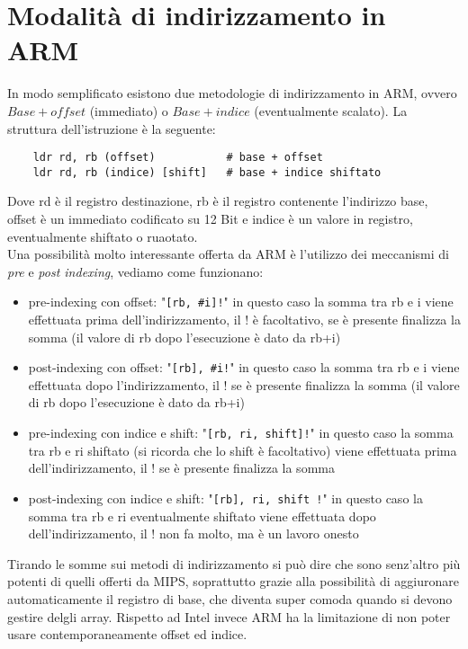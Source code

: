 \documentclass[class=book, crop=false]{standalone}
\begin{document}
\section{Modalità di indirizzamento in ARM}
In modo semplificato esistono due metodologie di indirizzamento in ARM, ovvero $Base + offset$ (immediato) o $Base + indice$ (eventualmente scalato). La struttura dell'istruzione è la seguente:

\begin{verbatim}
	ldr rd, rb (offset)           # base + offset
	ldr rd, rb (indice) [shift]   # base + indice shiftato
\end{verbatim}

Dove rd è il registro destinazione, rb è il registro contenente l'indirizzo base, offset è un immediato codificato su 12 Bit e indice è un valore in registro, eventualmente shiftato o ruaotato.\\
Una possibilità molto interessante offerta da ARM è l'utilizzo dei meccanismi di \emph{pre} e \emph{post indexing}, vediamo come funzionano:

\begin{itemize}
	\item pre-indexing con offset: "\texttt{[rb, \#i]!}" in questo caso la somma tra rb e i viene  effettuata prima dell'indirizzamento, il ! è facoltativo, se è presente finalizza la somma (il valore di rb dopo l'esecuzione è dato da rb+i)
	\item post-indexing con offset: "\texttt{[rb], \#i!}" in questo caso la somma tra rb e i viene  effettuata dopo l'indirizzamento, il ! se è presente finalizza la somma (il valore di rb dopo l'esecuzione è dato da rb+i)
	\item pre-indexing con indice e shift: "\texttt{[rb, ri, shift]!}" in questo caso la somma tra rb e ri shiftato (si ricorda che lo shift è facoltativo) viene  effettuata prima dell'indirizzamento, il ! se è presente finalizza la somma
	\item post-indexing con indice e shift: "\texttt{[rb], ri, shift !}" in questo caso la somma tra rb e ri eventualmente shiftato viene  effettuata dopo dell'indirizzamento, il ! non fa molto, ma è un lavoro onesto
\end{itemize}

Tirando le somme sui metodi di indirizzamento si può dire che sono senz'altro più potenti di quelli offerti da MIPS, soprattutto grazie alla possibilità di aggiuronare automaticamente il registro di base, che diventa super comoda quando si devono gestire delgli array. Rispetto ad Intel invece ARM ha la limitazione di non poter usare contemporaneamente offset ed indice.

\end{document}
